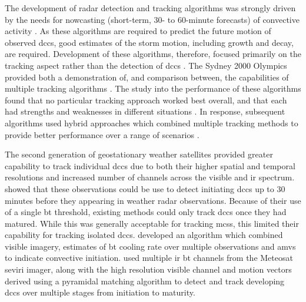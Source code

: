 The development of radar detection and tracking algorithms was strongly driven by the needs for nowcasting (short-term, 30- to 60-minute forecasts) of convective activity \citep{wilson_nowcasting_1998}.
As these algorithms are required to predict the future motion of observed \acrshort{dcc}s, good estimates of the storm motion, including growth and decay, are required.
Development of these algorithms, therefore, focused primarily on the tracking aspect rather than the detection of \acrshort{dcc}s \citep{lakshmanan_objective_2010}.
The Sydney 2000 Olympics provided both a demonstration of, and comparison between, the capabilities of multiple tracking algorithms \citep{keenan_sydney_2003}.
The study into the performance of these algorithms found that no particular tracking approach worked best overall, and that each had strengths and weaknesses in different situations \citep{wilson_sydney_2004}.
In response, subsequent algorithms used hybrid approaches which combined multiple tracking methods to provide better performance over a range of scenarios \citep{lakshmanan_warning_2007, han_3d_2009}.

The second generation of geostationary weather satellites provided greater capability to track individual \acrshort{dcc}s due to both their higher spatial and temporal resolutions and increased number of channels across the visible and \acrshort{ir} spectrum.
\citet{roberts_nowcasting_2003} showed that these observations could be use to detect initiating \acrshort{dcc}s up to 30 minutes before they appearing in weather radar observations.
Because of their use of a single \acrshort{bt} threshold, existing methods could only track \acrshort{dcc}s once they had matured.
While this was generally acceptable for tracking \acrshort{mcs}s, this limited their capability for tracking isolated \acrshort{dcc}s.
\citet{mecikalski_forecasting_2006} developed an algorithm which combined visible imagery, estimates of \acrshort{bt} cooling rate over multiple observations and \acrshort{amv}s to indicate convective initiation.
\citet{zinner_cb-tram_2008} used multiple \acrshort{ir} \acrshort{bt} channels from the Meteosat \acrshort{seviri} imager, along with the high resolution visible channel and motion vectors derived using a pyramidal matching algorithm to detect and track developing \acrshort{dcc}s over multiple stages from initiation to maturity.

